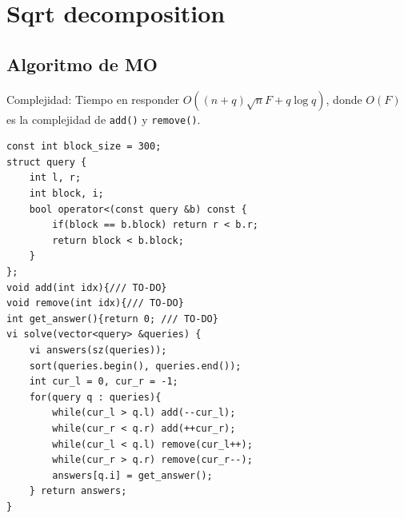 \section{Sqrt decomposition}
\subsection{Algoritmo de MO}
Complejidad: Tiempo en responder $O((n + q)\sqrt{n}F + q\log q)$, donde $O(F)$ es la complejidad de \texttt{add()} y \texttt{remove()}.
\begin{verbatim}
const int block_size = 300;
struct query {
    int l, r;
    int block, i;
    bool operator<(const query &b) const {
        if(block == b.block) return r < b.r;
        return block < b.block;
    }
};
void add(int idx){/// TO-DO}
void remove(int idx){/// TO-DO}
int get_answer(){return 0; /// TO-DO}
vi solve(vector<query> &queries) {
    vi answers(sz(queries));
    sort(queries.begin(), queries.end());
    int cur_l = 0, cur_r = -1;
    for(query q : queries){
        while(cur_l > q.l) add(--cur_l);
        while(cur_r < q.r) add(++cur_r);
        while(cur_l < q.l) remove(cur_l++);
        while(cur_r > q.r) remove(cur_r--);
        answers[q.i] = get_answer();
    } return answers;
}
\end{verbatim}